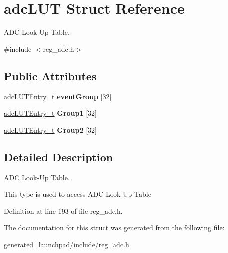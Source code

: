\hypertarget{structadcLUT}{}\section{adc\+L\+UT Struct Reference}
\label{structadcLUT}


A\+DC Look-\/\+Up Table.  




{\ttfamily \#include $<$reg\+\_\+adc.\+h$>$}

\subsection*{Public Attributes}
\begin{DoxyCompactItemize}
\item 
\mbox{\label{structadcLUT_a87ef9106488d6a72066ef2042bb6cd5d}} 
\mbox{\hyperlink{reg__adc_8h_a1c42e013424ed4edc03d76d40b801add}{adc\+L\+U\+T\+Entry\+\_\+t}} {\bfseries event\+Group} \mbox{[}32\mbox{]}
\item 
\mbox{\label{structadcLUT_aa6d11f4256c5dc27a0abc478f0686dd8}} 
\mbox{\hyperlink{reg__adc_8h_a1c42e013424ed4edc03d76d40b801add}{adc\+L\+U\+T\+Entry\+\_\+t}} {\bfseries Group1} \mbox{[}32\mbox{]}
\item 
\mbox{\label{structadcLUT_ae7dcdb3e0f0f3a8da504b6460e790df0}} 
\mbox{\hyperlink{reg__adc_8h_a1c42e013424ed4edc03d76d40b801add}{adc\+L\+U\+T\+Entry\+\_\+t}} {\bfseries Group2} \mbox{[}32\mbox{]}
\end{DoxyCompactItemize}


\subsection{Detailed Description}
A\+DC Look-\/\+Up Table. 

This type is used to access A\+DC Look-\/\+Up Table 

Definition at line 193 of file reg\+\_\+adc.\+h.



The documentation for this struct was generated from the following file\+:\begin{DoxyCompactItemize}
\item 
generated\+\_\+launchpad/include/\mbox{\hyperlink{reg__adc_8h}{reg\+\_\+adc.\+h}}\end{DoxyCompactItemize}
